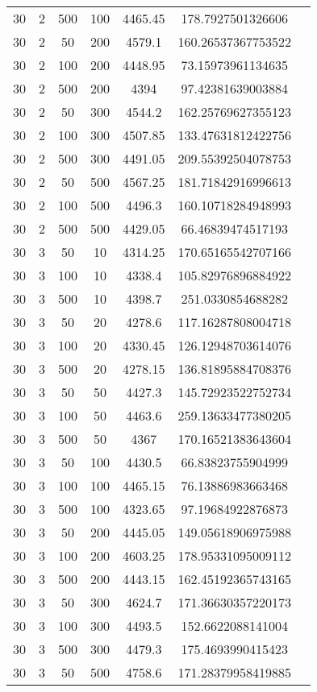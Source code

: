 {\begin{longtabu}{S
S
S
S
S
S[round-mode=places,round-precision=0]
S[round-mode=places,round-precision=0]}
30 & 2 & 500 & 100 & 4465.45 & 178.7927501326606 \\
30 & 2 & 50 & 200 & 4579.1 & 160.26537367753522 \\
30 & 2 & 100 & 200 & 4448.95 & 73.15973961134635 \\
30 & 2 & 500 & 200 & 4394 & 97.42381639003884 \\
30 & 2 & 50 & 300 & 4544.2 & 162.25769627355123 \\
30 & 2 & 100 & 300 & 4507.85 & 133.47631812422756 \\
30 & 2 & 500 & 300 & 4491.05 & 209.55392504078753 \\
30 & 2 & 50 & 500 & 4567.25 & 181.71842916996613 \\
30 & 2 & 100 & 500 & 4496.3 & 160.10718284948993 \\
30 & 2 & 500 & 500 & 4429.05 & 66.46839474517193 \\
30 & 3 & 50 & 10 & 4314.25 & 170.65165542707166 \\
30 & 3 & 100 & 10 & 4338.4 & 105.82976896884922 \\
30 & 3 & 500 & 10 & 4398.7 & 251.0330854688282 \\
30 & 3 & 50 & 20 & 4278.6 & 117.16287808004718 \\
30 & 3 & 100 & 20 & 4330.45 & 126.12948703614076 \\
30 & 3 & 500 & 20 & 4278.15 & 136.81895884708376 \\
30 & 3 & 50 & 50 & 4427.3 & 145.72923522752734 \\
30 & 3 & 100 & 50 & 4463.6 & 259.13633477380205 \\
30 & 3 & 500 & 50 & 4367 & 170.16521383643604 \\
30 & 3 & 50 & 100 & 4430.5 & 66.83823755904999 \\
30 & 3 & 100 & 100 & 4465.15 & 76.13886983663468 \\
30 & 3 & 500 & 100 & 4323.65 & 97.19684922876873 \\
30 & 3 & 50 & 200 & 4445.05 & 149.05618906975988 \\
30 & 3 & 100 & 200 & 4603.25 & 178.95331095009112 \\
30 & 3 & 500 & 200 & 4443.15 & 162.45192365743165 \\
30 & 3 & 50 & 300 & 4624.7 & 171.36630357220173 \\
30 & 3 & 100 & 300 & 4493.5 & 152.6622088141004 \\
30 & 3 & 500 & 300 & 4479.3 & 175.4693990415423 \\
30 & 3 & 50 & 500 & 4758.6 & 171.28379958419885 \\

\end{longtabu}}
